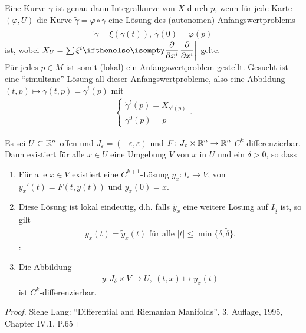 \begin{bem*}
  Eine Kurve $\gamma$ ist genau dann Integralkurve von $X$ durch $p$, wenn für jede Karte $(\varphi,U)$ die Kurve $\tilde \gamma = \varphi \circ \gamma$ eine Lösung des (autonomen) Anfangswertproblems
  \begin{align*}
    \dot{\tilde \gamma} = \xi(\gamma(t)),  \ \tilde \gamma(0) = \varphi(p)
  \end{align*}
  ist, wobei $X_U = \sum \xi^i \pdifffrac{}{x^i}$ gelte.\\

  Für jedes $p \in M$ ist somit (lokal) ein Anfangswertproblem gestellt. Gesucht ist eine "`simultane"' Lösung all dieser Anfangswertprobleme, also eine Abbildung $(t,p) \mapsto \gamma(t,p) = \gamma^i(p)$ mit 
  \begin{align*}
    \begin{cases}
      \dot \gamma^t(p) = X_{\gamma^t(p)}\\
      \gamma^0(p) = p
    \end{cases}.
  \end{align*}
\end{bem*}

\begin{satz}
  Es sei $U \subset \operatorname{\mathbb{R}}^n$ offen und $J_{\varepsilon}=(-\varepsilon,\varepsilon)$ und $F \colon J_{\varepsilon} \times \operatorname{\mathbb{R}}^n \to \operatorname{\mathbb{R}}^n$ $C^k$-differenzierbar.
  Dann existiert für alle $x \in U$ eine Umgebung $V$ von $x$ in $U$ und ein $\delta > 0$, so dass
  \begin{enumerate}
  \item Für alle $x \in V$ existiert eine $C^{k+1}$-Lösung $y_x\colon I_{\varepsilon} \to V$, von $y_x'(t)=F(t,y(t))$ und $y_x(0) = x$.
  \item Diese Lösung ist lokal eindeutig, d.h. falls $\tilde y_x$ eine weitere Lösung auf $I_{\tilde\delta}$ ist, so gilt
    \begin{align*}
      y_x(t) = \tilde y_x(t) \text{ für alle } |t| \leq \min\{\delta, \tilde\delta\}.
    \end{align*}
    :\item Die Abbildung 
    \begin{align*}
      y\colon J_{\delta} \times V \to U, \ (t,x) \mapsto y_x(t)
    \end{align*}
    ist $C^k$-differenzierbar.
  \end{enumerate}
\end{satz}

\begin{proof}
  Siehe Lang: "`Differential and Riemanian Manifolds"', 3. Auflage, 1995, Chapter IV.1, P.65 
\end{proof}

